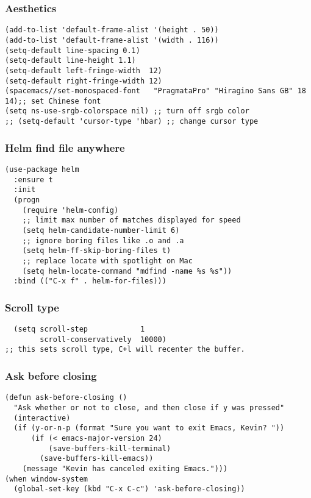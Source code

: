 \documentclass[11pt]{article}
\begin{document}
\subsubsection{Aesthetics}
\label{sec:orgheadline4}
\begin{verbatim}
(add-to-list 'default-frame-alist '(height . 50))
(add-to-list 'default-frame-alist '(width . 116))
(setq-default line-spacing 0.1)
(setq-default line-height 1.1)
(setq-default left-fringe-width  12)
(setq-default right-fringe-width 12)
(spacemacs//set-monospaced-font   "PragmataPro" "Hiragino Sans GB" 18 14);; set Chinese font
(setq ns-use-srgb-colorspace nil) ;; turn off srgb color
;; (setq-default 'cursor-type 'hbar) ;; change cursor type
\end{verbatim}
\subsubsection{Helm find file anywhere}
\label{sec:orgheadline5}
\begin{verbatim}
(use-package helm
  :ensure t
  :init
  (progn
    (require 'helm-config)
    ;; limit max number of matches displayed for speed
    (setq helm-candidate-number-limit 6)
    ;; ignore boring files like .o and .a
    (setq helm-ff-skip-boring-files t)
    ;; replace locate with spotlight on Mac
    (setq helm-locate-command "mdfind -name %s %s"))
  :bind (("C-x f" . helm-for-files)))
\end{verbatim}
\subsubsection{Scroll type}
\label{sec:orgheadline6}
\begin{verbatim}
  (setq scroll-step            1
        scroll-conservatively  10000)
;; this sets scroll type, C+l will recenter the buffer.
\end{verbatim}
\subsubsection{Ask before closing}
\label{sec:orgheadline7}
\begin{verbatim}
(defun ask-before-closing ()
  "Ask whether or not to close, and then close if y was pressed"
  (interactive)
  (if (y-or-n-p (format "Sure you want to exit Emacs, Kevin? "))
      (if (< emacs-major-version 24)
          (save-buffers-kill-terminal)
        (save-buffers-kill-emacs))
    (message "Kevin has canceled exiting Emacs.")))
(when window-system
  (global-set-key (kbd "C-x C-c") 'ask-before-closing))
\end{verbatim}
\end{document}
